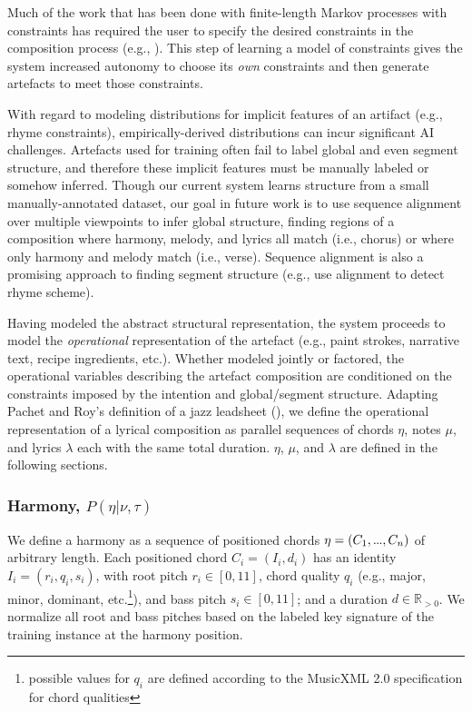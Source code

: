 \documentclass[letterpaper]{article}
\newcommand\mydots{\hbox to .75em{.\hss.\hss.}}
\begin{document}
Much of the work that has been done with finite-length Markov processes with constraints has required the user to specify the desired constraints in the composition process (e.g., \cite{pachet2014imitative,barbieri2012markov}). This step of learning a model of constraints gives the system increased autonomy to choose its \emph{own} constraints and then generate artefacts to meet those constraints.

With regard to modeling distributions for implicit features of an artifact (e.g., rhyme constraints), empirically-derived distributions can incur significant AI challenges. Artefacts used for training often fail to label global and even segment structure, and therefore these implicit features must be manually labeled or somehow inferred. Though our current system learns structure from a small manually-annotated dataset, our goal in future work is to use sequence alignment over multiple viewpoints to infer global structure, finding regions of a composition where harmony, melody, and lyrics all match (i.e., chorus) or where only harmony and melody match (i.e., verse). Sequence alignment is also a promising approach to finding segment structure (e.g., \citeauthor{hirjee2010using}  use alignment to detect rhyme scheme).

Having modeled the abstract structural representation, the system proceeds to model the \emph{operational} representation of the artefact (e.g., paint strokes, narrative text, recipe ingredients, etc.). Whether modeled jointly or factored, the operational variables describing the artefact composition are conditioned on the constraints imposed by the intention and global/segment structure. Adapting Pachet and Roy's definition of a jazz leadsheet (\citeyear{pachet2014imitative}), we define the operational representation of a lyrical composition as parallel sequences of chords $\eta$, notes $\mu$, and lyrics $\lambda$ each with the same total duration. $\eta$, $\mu$, and $\lambda$ are defined in the following sections.

\subsubsection{Harmony, $P(\eta|\nu,\tau)$}

We define a harmony as a sequence of positioned chords $\eta = (C_1,\mydots,C_n)$ of arbitrary length. Each positioned chord $C_i = (I_i,d_i)$ has an identity $I_i = (r_i,q_i,s_i)$, with root pitch $r_i\in[0,11]$, chord quality $q_i$ (e.g., major, minor, dominant, etc.\footnote{possible values for $q_i$ are defined according to the MusicXML 2.0 specification for chord qualities}), and bass pitch $s_i\in[0,11]$; and a duration $d \in \mathbb{R}_{>0}$. We normalize all root and bass pitches based on the labeled key signature of the training instance at the harmony position.
\end{document}

